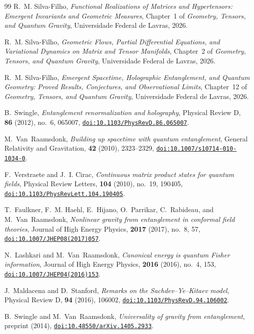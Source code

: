 \documentclass[11pt,a4paper,reqno]{amsart}
\theoremstyle{definition}
\numberwithin{equation}{section}
\providecommand{\doi}[1]{\href{https://doi.org/#1}{\nolinkurl{doi:#1}}}
\begin{document}
\begin{thebibliography}{99}
 R.~M. Silva-Filho, \emph{Functional Realizations of Matrices and Hypertensors: Emergent Invariants and Geometric Measures}, Chapter~1 of \emph{Geometry, Tensors, and Quantum Gravity}, Universidade Federal de Lavras, 2026.

 R.~M. Silva-Filho, \emph{Geometric Flows, Partial Differential Equations, and Variational Dynamics on Matrix and Tensor Manifolds}, Chapter~2 of \emph{Geometry, Tensors, and Quantum Gravity}, Universidade Federal de Lavras, 2026.

 R.~M. Silva-Filho, \emph{Emergent Spacetime, Holographic Entanglement, and Quantum Geometry: Proved Results, Conjectures, and Observational Limits}, Chapter~12 of \emph{Geometry, Tensors, and Quantum Gravity}, Universidade Federal de Lavras, 2026.

B.~Swingle,
\emph{Entanglement renormalization and holography},
Physical Review D, \textbf{86} (2012), no.~6, 065007,
\doi{10.1103/PhysRevD.86.065007}.

M.~Van~Raamsdonk,
\emph{Building up spacetime with quantum entanglement},
General Relativity and Gravitation, \textbf{42} (2010), 2323--2329,
\doi{10.1007/s10714-010-1034-0}.

F.~Verstraete and J.~I. Cirac,
\emph{Continuous matrix product states for quantum fields},
Physical Review Letters, \textbf{104} (2010), no.~19, 190405,
\doi{10.1103/PhysRevLett.104.190405}.

T.~Faulkner, F.~M. Haehl, E.~Hijano, O.~Parrikar, C.~Rabideau, and M.~Van~Raamsdonk,
\emph{Nonlinear gravity from entanglement in conformal field theories},
Journal of High Energy Physics, \textbf{2017} (2017), no.~8, 57,
\doi{10.1007/JHEP08(2017)057}.

N.~Lashkari and M.~Van~Raamsdonk,
\emph{Canonical energy is quantum Fisher information},
Journal of High Energy Physics, \textbf{2016} (2016), no.~4, 153,
\doi{10.1007/JHEP04(2016)153}.

J.~Maldacena and D.~Stanford,
\emph{Remarks on the Sachdev--Ye--Kitaev model},
Physical Review D, \textbf{94} (2016), 106002,
\doi{10.1103/PhysRevD.94.106002}.

B.~Swingle and M.~Van~Raamsdonk,
\emph{Universality of gravity from entanglement},
preprint (2014),
\doi{10.48550/arXiv.1405.2933}.


\end{thebibliography}
\end{document}
